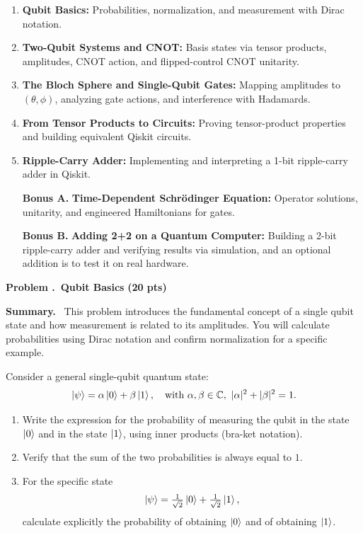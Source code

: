 \documentclass[11pt]{article}
\newcommand{\pts}[1]{\hfill{\small\bfseries(#1 pts)}}
\newenvironment{summary}{\vspace{2pt}\noindent\textbf{Summary.}~}{\par\vspace{6pt}}
\newcounter{problem}
\newcommand{\problem}[2]{%
  \refstepcounter{problem}
  \vspace{10pt}\noindent\textbf{Problem \theproblem.~#1} \pts{#2}\par
}
\begin{document}
\begin{enumerate}
  \item \textbf{Qubit Basics:} Probabilities, normalization, and measurement with Dirac notation.
  \item \textbf{Two-Qubit Systems and CNOT:} Basis states via tensor products, amplitudes, CNOT action, and flipped-control CNOT unitarity.
  \item \textbf{The Bloch Sphere and Single-Qubit Gates:} Mapping amplitudes to $(\theta,\phi)$, analyzing gate actions, and interference with Hadamards.
  \item \textbf{From Tensor Products to Circuits:} Proving tensor-product properties and building equivalent Qiskit circuits.
  \item \textbf{Ripple-Carry Adder:} Implementing and interpreting a 1-bit ripple-carry adder in Qiskit.
  \item[\textbf{Bonus A.}] \textbf{Time-Dependent Schr\"odinger Equation:} Operator solutions, unitarity, and engineered Hamiltonians for gates.
  \item[\textbf{Bonus B.}] \textbf{Adding 2+2 on a Quantum Computer:} Building a 2-bit ripple-carry adder and verifying results via simulation, and an optional addition is to test it on real hardware.
\end{enumerate}

\problem{Qubit Basics}{20}
\begin{summary}
This problem introduces the fundamental concept of a single qubit state and how measurement is related to its amplitudes. You will calculate probabilities using Dirac notation and confirm normalization for a specific example.
\end{summary}

Consider a general single-qubit quantum state:
\[
\ket{\psi} = \alpha \ket{0} + \beta \ket{1}, \quad \text{with } \alpha, \beta \in \mathbb{C}, \ |\alpha|^2 + |\beta|^2 = 1.
\]

\begin{enumerate}[label=(\alph*)]
  \item Write the expression for the probability of measuring the qubit in the state $\ket{0}$ and in the state $\ket{1}$, using inner products (bra-ket notation).
  \item Verify that the sum of the two probabilities is always equal to $1$.
  \item For the specific state 
  \[
  \ket{\psi} = \tfrac{1}{\sqrt{2}}\ket{0} + \tfrac{1}{\sqrt{2}}\ket{1},
  \]
  calculate explicitly the probability of obtaining $\ket{0}$ and of obtaining $\ket{1}$.
\end{enumerate}
\end{document}
